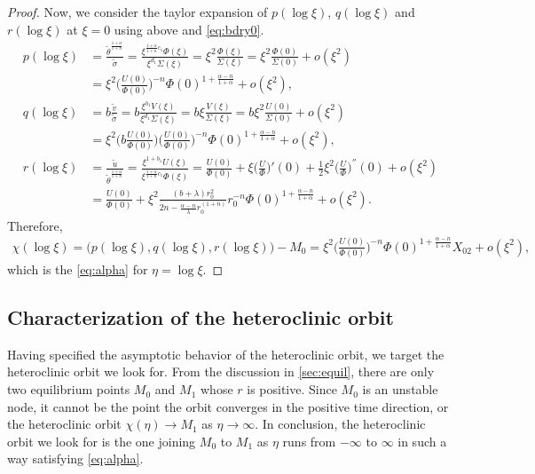 \documentclass[a4paper,11pt]{article}
\def\tv{{\tilde{v}}}
\def\tth{{\tilde{\theta}}}
\def\ts{{\tilde{\sigma}}}
\def\tu{{\tilde{u}}}
\begin{document}
\begin{proof}
Now, we consider the taylor expansion of $p(\log\xi)$, $q(\log\xi)$ and $r(\log\xi)$ at $\xi=0$ using above and \eqref{eq:bdry0}.
\begin{align*}
 p(\log\xi) &= \frac{ \tth^{\frac{1+\alpha}{1+n}} }{\ts} = \frac{ \xi^{\frac{1+\alpha}{1+n}c_1} \Phi(\xi)}{\xi^{d_1} \Sigma(\xi)} = \xi^2\frac{\Phi(\xi)}{\Sigma(\xi)} = \xi^2\frac{\Phi(0)}{\Sigma(0)} + o(\xi^2) \\
 &= \xi^2\Big(\frac{U(0)}{\Phi(0)}\Big)^{-n}\Phi(0)^{1+\frac{\alpha-n}{1+\alpha}} + o(\xi^2),\\
 q(\log\xi) &= b\frac{\tv}{\ts} = b\frac{ \xi^{b_1} V(\xi) }{ \xi^{d_1} \Sigma(\xi)} = b\xi\frac{ V(\xi) }{ \Sigma(\xi)} = b\xi^2 \frac{U(0)}{\Sigma(0)}+ o(\xi^2) \\
 &= \xi^2\Big(b\frac{U(0)}{\Phi(0)}\Big)\Big(\frac{U(0)}{\Phi(0)}\Big)^{-n}\Phi(0)^{1+\frac{\alpha-n}{1+\alpha}} + o(\xi^2),\\
 r(\log\xi) &= \frac{\tu}{ \tth^{\frac{1+\alpha}{1+n}} } = \frac{ \xi^{1+b_1}U(\xi) }{ \xi^{\frac{1+\alpha}{1+n}c_1}\Phi(\xi) } = \frac{ U(0) }{ \Phi(0) }+ \xi \Big(\frac{U}{\Phi}\Big)'(0) + \frac{1}{2}\xi^2\Big(\frac{U}{\Phi}\Big)^{''}(0) + o(\xi^2)\\
  &=\frac{ U(0) }{ \Phi(0) } + \xi^2\frac{ (b+\lambda) r_0^{2} }{ 2n - \frac{\alpha-n}{\lambda}r_0^{(1+n)}} r_0^{-n} \Phi(0)^{1+\frac{\alpha-n}{1+\alpha}} + o(\xi^2).
\end{align*}
Therefore,
\begin{align*}
\chi(\log\xi) = \big(p(\log\xi),q(\log\xi),r(\log\xi)\big) -M_0 = \xi^2\Big(\frac{U(0)}{\Phi(0)}\Big)^{-n}\Phi(0)^{1+\frac{\alpha-n}{1+\alpha}} X_{02} + o(\xi^2),
\end{align*}
which is the \eqref{eq:alpha} for $\eta=\log\xi$.
\end{proof}

\subsection{Characterization of the heteroclinic orbit}
Having specified the asymptotic behavior of the heteroclinic orbit, we target the heteroclinic orbit we look for. From the discussion in \ref{sec:equil}, there are only two equilibrium points $M_0$ and $M_1$ whose $r$ is positive. Since $M_0$ is an unstable node, it cannot be the point the orbit converges in the positive time direction, or the heteroclinic orbit $\chi(\eta) \rightarrow M_1$ as $\eta \rightarrow \infty$. In conclusion, the heteroclinic orbit we look for is the one joining $M_0$ to $M_1$ as $\eta$ runs from $-\infty$ to $\infty$ in such a way satisfying \eqref{eq:alpha}.
\end{document}
